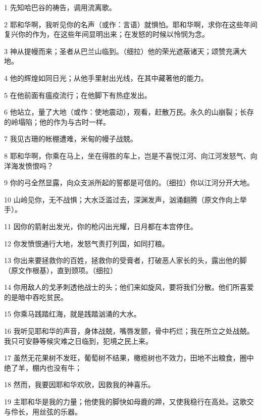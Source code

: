 \par 1 先知哈巴谷的祷告，调用流离歌。
\par 2 耶和华啊，我听见你的名声（或作：言语）就惧怕。耶和华啊，求你在这些年间复兴你的作为，在这些年间显明出来；在发怒的时候以怜悯为念。
\par 3 神从提幔而来；圣者从巴兰山临到。（细拉）他的荣光遮蔽诸天；颂赞充满大地。
\par 4 他的辉煌如同日光；从他手里射出光线，在其中藏著他的能力。
\par 5 在他前面有瘟疫流行；在他脚下有热症发出。
\par 6 他站立，量了大地（或作：使地震动），观看，赶散万民。永久的山崩裂；长存的岭塌陷；他的作为与古时一样。
\par 7 我见古珊的帐棚遭难，米甸的幔子战兢。
\par 8 耶和华啊，你乘在马上，坐在得胜的车上，岂是不喜悦江河、向江河发怒气、向洋海发愤恨吗？
\par 9 你的弓全然显露，向众支派所起的誓都是可信的。（细拉）你以江河分开大地。
\par 10 山岭见你，无不战惧；大水泛滥过去，深渊发声，汹涌翻腾（原文作向上举手）。
\par 11 因你的箭射出发光，你的枪闪出光耀，日月都在本宫停住。
\par 12 你发愤恨通行大地，发怒气责打列国，如同打粮。
\par 13 你出来要拯救你的百姓，拯救你的受膏者，打破恶人家长的头，露出他的脚（原文作根基），直到颈项。（细拉）
\par 14 你用敌人的戈矛刺透他战士的头；他们来如旋风，要将我们分散。他们所喜爱的是暗中吞吃贫民。
\par 15 你乘马践踏红海，就是践踏汹涌的大水。
\par 16 我听见耶和华的声音，身体战兢，嘴唇发颤，骨中朽烂；我在所立之处战兢。我只可安静等候灾难之日临到，犯境之民上来。
\par 17 虽然无花果树不发旺，葡萄树不结果，橄榄树也不效力，田地不出粮食，圈中绝了羊，棚内也没有牛；
\par 18 然而，我要因耶和华欢欣，因救我的神喜乐。
\par 19 主耶和华是我的力量；他使我的脚快如母鹿的蹄，又使我稳行在高处。这歌交与伶长，用丝弦的乐器。


